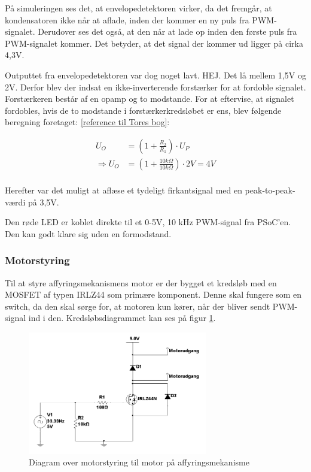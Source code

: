På simuleringen ses det, at envelopedetektoren virker, da det fremgår, at kondensatoren ikke når at aflade, inden der kommer en ny puls fra PWM-signalet. Derudover ses det også, at den når at lade op inden den første puls fra PWM-signalet kommer. Det betyder, at det signal der kommer ud ligger på cirka 4,3V. 

Outputtet fra envelopedetektoren var dog noget lavt. HEJ. Det lå mellem 1,5V og 2V. Derfor blev der indsat en ikke-inverterende forstærker for at fordoble signalet. Forstærkeren består af en opamp og to modstande. For at eftervise, at signalet fordobles, hvis de to modstande i forstærkerkredsløbet er ens, blev følgende beregning foretaget: \ref{reference til Tores bog}: 

\begin{align}
U_{O}&=(1+\frac{R_{2}}{R_{1}}) \cdot U_{P} \\ 	\nonumber
\Rightarrow U_{O}&=(1+\frac{10k\Omega}{10k\Omega}) \cdot 2V = 4V \\	\nonumber 
\end{align}

Herefter var det muligt at aflæse et tydeligt firkantsignal med en peak-to-peak-værdi på 3,5V. 

Den røde LED er koblet direkte til et 0-5V, 10 kHz PWM-signal fra PSoC'en. Den kan godt klare sig uden en formodstand. 

\subsubsection{Motorstyring}
Til at styre affyringsmekanismens motor er der bygget et kredsløb med en MOSFET af typen IRLZ44 som primære komponent. Denne skal fungere som en switch, da den skal sørge for, at motoren kun kører, når der bliver sendt PWM-signal ind i den. Kredsløbsdiagrammet kan ses på figur \ref{fig:affyringsmotor}. 

\begin{figure}[H]
	\centering
	\includegraphics[width=0.7\textwidth]{Afsnit/DesignOgImplementering/images/affyringsmotor}
	\caption{Diagram over motorstyring til motor på affyringsmekanisme}
	\label{fig:affyringsmotor}
\end{figure}

